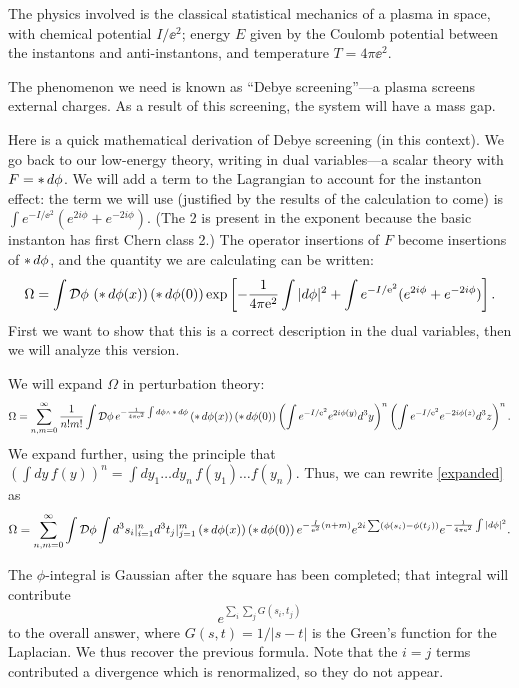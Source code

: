 The physics involved is the classical statistical mechanics of a plasma in
space, with chemical potential $I/\ee^2$; energy $E$ given by the Coulomb
potential between the instantons and anti-instantons, and temperature
 $T=4\pi\ee^2$.

The phenomenon we need is known as ``Debye screening''---a plasma screens
external charges.  As a result of this screening, the system will have a mass
gap.

Here is a quick mathematical derivation of Debye screening (in this context).
We go back to our low-energy theory, writing in dual variables---a scalar
theory with $F=\mathop{*} d\phi$.  We will add a term to the Lagrangian to account
for the instanton effect: the term we will use (justified by the results of the
calculation to come) is $\int e^{-I/\ee^2}(e^{2i\phi}+e^{-2i\phi})$.
(The 2 is present in the exponent because the basic instanton has first
Chern class 2.)
The operator
insertions of $F$ become insertions of $\mathop{*} d\phi$, and the quantity we are
calculating can be written:
\begin{equation}
\Omega=\int {\cal D}\phi\,\left(\mathop{*} d\phi(x)\right)\left(\mathop{*} d\phi(0)\right)
\exp\left[-\frac1{4\pi\text{e}^2}\int|d\phi|^2+\int
e^{-I/\text{e}^2}(e^{2i\phi}+e^{-2i\phi})\right].
\end{equation}
First we want to show that this is a correct description in the dual variables,
then we will analyze this version.

We will expand $\Omega$ in perturbation theory:
\begin{equation}\label{expanded}
\Omega=\sum_{n,m=0}^\infty \frac1{n!m!}\int \cD\phi\,
e^{-\frac1{4\pi\ee^2}\int d\phi\wdg\hstar d\phi}
\left(\hstar d\phi(x)\right)\left(\hstar d\phi(0)\right)
\left(\int e^{-I/\ee^2}e^{2i\phi(y)}d^3y\right)^n
\left(\int e^{-I/\ee^2}e^{-2i\phi(z)}d^3z\right)^n.
\end{equation}
We expand further, using the principle that $\left(\int dy\,f(y)\right)^n
=\int dy_1\dots dy_n\,f(y_1)\dots f(y_n)$.  Thus, we can rewrite
\eqref{expanded} as
\begin{equation}
\Omega=\sum_{n,m=0}^\infty \int {\cal D}\phi\int d^3s_i|_{i=1}^n d^3t_j|_{j=1}^m
\left(\mathop{*} d\phi(x)\right)\left(\mathop{*} d\phi(0)\right)
e^{-\frac{I}{\text{e}^2}(n+m)} e^{2i\sum(\phi(s_i)-\phi(t_j))}
e^{-\frac1{4\pi\text{e}^2}\int|d\phi|^2}.
\end{equation}

The $\phi$-integral is Gaussian after the square has been completed; that
integral will contribute
\begin{equation}
e^{\sum_i\sum_j G(s_i,t_j)}
\end{equation}
to the overall answer, where $G(s,t)=1/|s-t|$ is the Green's function for the
Laplacian.  We thus recover the previous formula.
Note that the
$i=j$ terms contributed a divergence which is renormalized, so they do not
appear.


